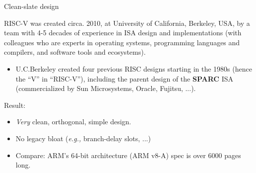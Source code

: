 \documentclass{article}
\newcommand{\eg}{\emph{e.g.,}}
\begin{document}
\begin{center}\LARGE
  {\Huge Clean-slate design}

  \vspace{1in}

  \begin{minipage}{9in}
    RISC-V was created circa. 2010, at University of California,
    Berkeley, USA, by a team with 4-5 decades of experience in ISA
    design and implementations (with colleagues who are experts in
    operating systems, programming languages and compilers, and
    software tools and ecosystems).

    \begin{itemize}
    \item U.C.Berkeley created four previous RISC designs starting in
      the 1980s (hence the ``V'' in ``RISC-V''), including the parent
      design of the {\bf SPARC} ISA (commercialized by Sun
      Microsystems, Oracle, Fujitsu, ...).
    \end{itemize}
  \end{minipage}

  \vspace{1in}

  \begin{minipage}{9in}
    Result:
    \begin{itemize}
    \item \emph{Very} clean, orthogonal, simple design.
    \item No legacy bloat ({\eg} branch-delay slots, ...)
    \item Compare: ARM’s 64-bit architecture (ARM v8-A) spec is over 6000 pages long.
    \end{itemize}
  \end{minipage}

\end{center}

\clearpage

\end{document}
